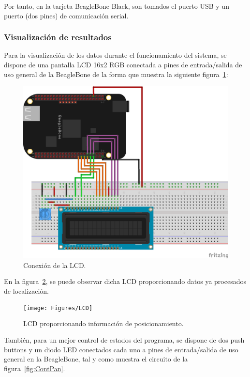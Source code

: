 Por tanto, en la tarjeta BeagleBone Black, son tomados el puerto USB y un puerto (dos pines) de comunicación serial.\\

\subsubsection{Visualización de resultados}

Para la visualización de los datos durante el funcionamiento del sistema, se dispone de una pantalla LCD 16x2 RGB conectada a pines de entrada/salida de uso general de la BeagleBone de la forma que muestra la siguiente figura~\ref{fig:LCDCon}:

\begin{figure}[H]
\centering
\includegraphics[scale=0.75]{Figures/LCD_Con}
\caption[Conexión de la LCD.]{Conexión de la LCD.}
\label{fig:LCDCon}
\end{figure}

En la figura~\ref{fig:LCDFunc}, se puede observar dicha LCD proporcionando datos ya procesados de localización. 

\begin{figure}[H]
\centering
\texttt{[image: Figures/LCD]}
\caption[LCD proporcionando información de posicionamiento.]{LCD proporcionando información de posicionamiento.}
\label{fig:LCDFunc}
\end{figure}

También, para un mejor control de estados del programa, se dispone de dos push buttons y un diodo LED conectados cada uno a pines de entrada/salida de uso general en la BeagleBone, tal y como muestra el circuito de la figura~\ref{fig:ContPan}.

